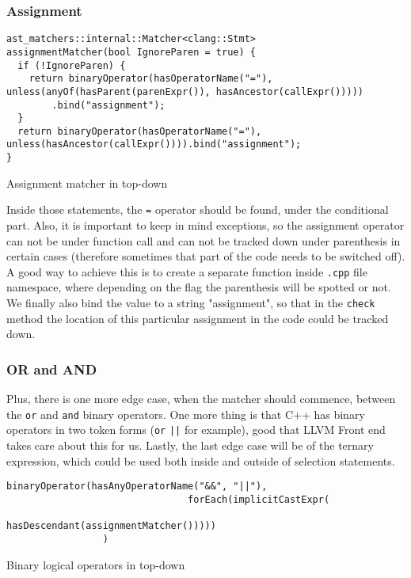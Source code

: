 \subsubsection{Assignment}
\begin{listing}[H]
\begin{verbatim}
ast_matchers::internal::Matcher<clang::Stmt>
assignmentMatcher(bool IgnoreParen = true) {
  if (!IgnoreParen) {
    return binaryOperator(hasOperatorName("="), unless(anyOf(hasParent(parenExpr()), hasAncestor(callExpr()))))
        .bind("assignment");
  }
  return binaryOperator(hasOperatorName("="), unless(hasAncestor(callExpr()))).bind("assignment");
}
\end{verbatim}
\caption{Assignment matcher in top-down}
\end{listing}


Inside those statements, the \lstinline{=} operator should be found, under the conditional part. Also, it is important to keep in mind exceptions, so the assignment operator can not be under function call and can not be tracked down under parenthesis in certain cases (therefore sometimes that part of the code needs to be switched off). A good way to achieve this is to create a separate function inside \lstinline{.cpp} file namespace, where depending on the flag the parenthesis will be spotted or not. We finally also bind the value to a string "assignment", so that in the \lstinline{check} method the location of this particular assignment in the code could be tracked down.  


\subsubsection{OR and AND}

Plus, there is one more edge case, when the matcher should commence, between the \lstinline{or} and \lstinline{and} binary operators. One more thing is that C++ has binary operators in two token forms (\lstinline{or} \lstinline{||} for example), good that LLVM Front end takes care about this for us. Lastly, the last edge case will be of the ternary expression, which could be used both inside and outside of selection statements. 

\begin{listing}[H]
\begin{verbatim}
binaryOperator(hasAnyOperatorName("&&", "||"),
                                forEach(implicitCastExpr(
                                    hasDescendant(assignmentMatcher()))))
                 )
\end{verbatim}
\caption{Binary logical operators in top-down}
\end{listing}


